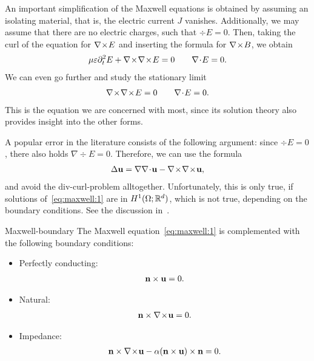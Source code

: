 \begin{intro}
  An important simplification of the Maxwell equations is obtained by
  assuming an isolating material, that is, the electric current $J$
  vanishes. Additionally, we may assume that there are no electric
  charges, such that $\div E=0$. Then, taking the curl of the equation
  for $\nabla\!\times\! E$ and inserting the formula for $\nabla\!\times\! B$, we obtain
  \begin{gather}
    \mu\varepsilon \partial_t^2 E + \nabla\!\times\!\nabla\!\times\! E = 0
    \qquad \nabla\!\cdot\! E=0.
  \end{gather}
  We can even go further and study the stationary limit
  \begin{gather}
    \label{eq:maxwell:1}
    \nabla\!\times\!\nabla\!\times\! E=0 \qquad \nabla\!\cdot\! E=0.
  \end{gather}
  This is the equation we are concerned with most, since its solution
  theory also provides insight into the other forms.
\end{intro}

\begin{remark}
  A popular error in the literature consists of the following
  argument: since $\div E = 0$, there also holds $\nabla \div E =
  0$. Therefore, we can use the formula
  \begin{gather}
    \Delta \mathbf u = \nabla\nabla\!\cdot\! \mathbf u - \nabla\!\times\!\nabla\!\times\! \mathbf u,
  \end{gather}
  and avoid the div-curl-problem alltogether. Unfortunately, this is
  only true, if solutions of~\eqref{eq:maxwell:1} are in
  $H^1(\Omega;\mathbb R^d)$, which is not true, depending on the boundary
  conditions. See the discussion in~\cite{CostabelDauge00}.
\end{remark}

\begin{Definition}{Maxwell-boundary}
  The Maxwell equation~\eqref{eq:maxwell:1} is complemented with the
  following boundary conditions:
  \begin{itemize}
  \item Perfectly conducting:
    \begin{gather}
      \mathbf n\times \mathbf u = 0.
    \end{gather}
    \item Natural:
      \begin{gather}
        \mathbf n\times \nabla\!\times\! \mathbf u = 0.
      \end{gather}
    \item Impedance:
      \begin{gather}
        \mathbf n\times \nabla\!\times\! \mathbf u - \alpha  (\mathbf n\times \mathbf u) \times \mathbf n = 0.
      \end{gather}
  \end{itemize}
\end{Definition}

